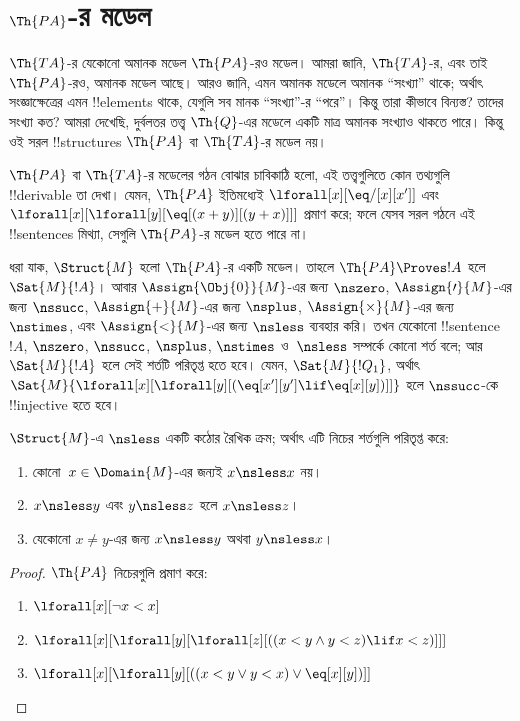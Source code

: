 \documentclass[../../../include/open-logic-section]{subfiles}
\begin{document}
\section{$\Th{PA}$-র মডেল}

\begin{explain}
$\Th{TA}$-র যেকোনো অমানক মডেল $\Th{PA}$-রও মডেল। আমরা জানি,
$\Th{TA}$-র, এবং তাই $\Th{PA}$-রও, অমানক মডেল আছে। আরও জানি, এমন
অমানক মডেলে অমানক ``সংখ্যা'' থাকে; অর্থাৎ সংজ্ঞাক্ষেত্রের এমন
!!{element}s থাকে, যেগুলি সব মানক ``সংখ্যা''-র ``পরে''। কিন্তু তারা
কীভাবে বিন্যস্ত? তাদের সংখ্যা কত? আমরা দেখেছি, দুর্বলতর তত্ত্ব
$\Th{Q}$-এর মডেলে একটি মাত্র অমানক সংখ্যাও থাকতে পারে। কিন্তু ওই সরল
!!{structure}s $\Th{PA}$ বা $\Th{TA}$-র মডেল নয়।

$\Th{PA}$ বা $\Th{TA}$-র মডেলের গঠন বোঝার চাবিকাঠি হলো, এই
তত্ত্বগুলিতে কোন তথ্যগুলি !!{derivable} তা দেখা। যেমন, $\Th{PA}$
ইতিমধ্যেই $\lforall[x][\eq/[x][x']]$ এবং
$\lforall[x][\lforall[y][\eq[(x+y)][(y+x)]]]$ প্রমাণ করে; ফলে যেসব
সরল গঠনে এই !!{sentence}s মিথ্যা, সেগুলি $\Th{PA}$-র মডেল হতে পারে না।

ধরা যাক, $\Struct{M}$ হলো $\Th{PA}$-র একটি মডেল। তাহলে
$\Th{PA} \Proves !A$ হলে $\Sat{M}{!A}$। আবার
$\Assign{\Obj{0}}{M}$-এর জন্য $\nszero$, $\Assign{\prime}{M}$-এর জন্য
$\nssucc$, $\Assign{+}{M}$-এর জন্য $\nsplus$,
$\Assign{\times}{M}$-এর জন্য $\nstimes$, এবং $\Assign{<}{M}$-এর জন্য
$\nsless$ ব্যবহার করি। তখন যেকোনো !!{sentence}~$!A$, $\nszero$,
$\nssucc$, $\nsplus$, $\nstimes$ ও~$\nsless$ সম্পর্কে কোনো শর্ত বলে;
আর $\Sat{M}{!A}$ হলে সেই শর্তটি পরিতৃপ্ত হতে হবে। যেমন,
$\Sat{M}{!Q_1}$, অর্থাৎ
$\Sat{M}{\lforall[x][\lforall[y][(\eq[x'][y'] \lif \eq[x][y])]]}$ হলে
$\nssucc$-কে !!{injective} হতে হবে।
\end{explain}

\begin{prop}
$\Struct{M}$-এ $\nsless$ একটি কঠোর রৈখিক ক্রম; অর্থাৎ এটি নিচের
শর্তগুলি পরিতৃপ্ত করে:
\begin{enumerate}
\item কোনো~$x \in \Domain{M}$-এর জন্যই $x \nsless x$ নয়।
\item $x \nsless y$ এবং $y \nsless z$ হলে $x \nsless z$।
\item যেকোনো $x \neq y$-এর জন্য $x \nsless y$ অথবা $y \nsless x$।
\end{enumerate}
\end{prop}

\begin{proof}
$\Th{PA}$ নিচেরগুলি প্রমাণ করে:
\begin{enumerate}
\item $\lforall[x][\lnot x < x]$
\item $\lforall[x][\lforall[y][\lforall[z][((x < y \land y < z) \lif x < z)]]]$
\item $\lforall[x][\lforall[y][((x < y \lor y < x) \lor \eq[x][y])]]$
\end{enumerate}
\end{proof}
\end{document}
